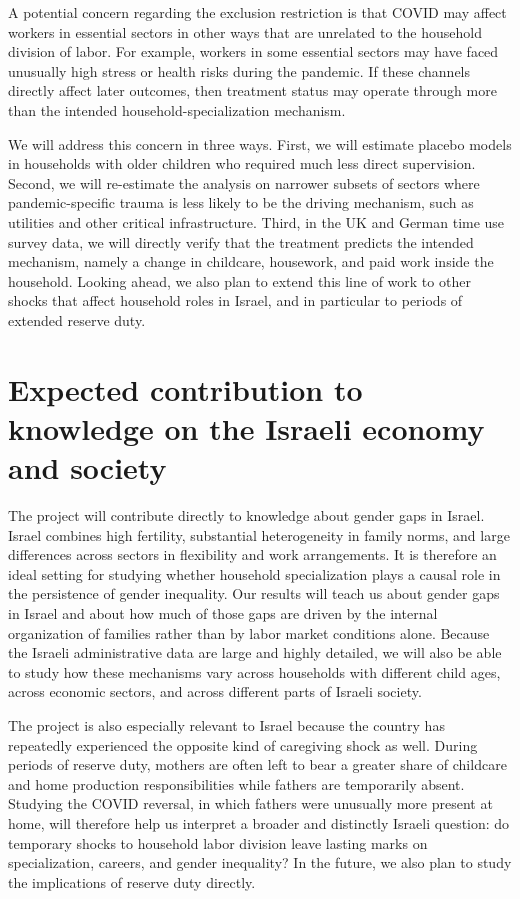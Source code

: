 \documentclass[12pt]{article}
\begin{document}
A potential concern regarding the exclusion restriction is that COVID may affect workers in essential sectors in other ways that are unrelated to the household division of labor. For example, workers in some essential sectors may have faced unusually high stress or health risks during the pandemic. If these channels directly affect later outcomes, then treatment status may operate through more than the intended household-specialization mechanism.

We will address this concern in three ways. First, we will estimate placebo models in households with older children who required much less direct supervision. Second, we will re-estimate the analysis on narrower subsets of sectors where pandemic-specific trauma is less likely to be the driving mechanism, such as utilities and other critical infrastructure. Third, in the UK and German time use survey data, we will directly verify that the treatment predicts the intended mechanism, namely a change in childcare, housework, and paid work inside the household. Looking ahead, we also plan to extend this line of work to other shocks that affect household roles in Israel, and in particular to periods of extended reserve duty.

\section{Expected contribution to knowledge on the Israeli economy and society}

The project will contribute directly to knowledge about gender gaps in Israel. Israel combines high fertility, substantial heterogeneity in family norms, and large differences across sectors in flexibility and work arrangements. It is therefore an ideal setting for studying whether household specialization plays a causal role in the persistence of gender inequality. Our results will teach us about gender gaps in Israel and about how much of those gaps are driven by the internal organization of families rather than by labor market conditions alone. Because the Israeli administrative data are large and highly detailed, we will also be able to study how these mechanisms vary across households with different child ages, across economic sectors, and across different parts of Israeli society.

The project is also especially relevant to Israel because the country has repeatedly experienced the opposite kind of caregiving shock as well. During periods of reserve duty, mothers are often left to bear a greater share of childcare and home production responsibilities while fathers are temporarily absent. Studying the COVID reversal, in which fathers were unusually more present at home, will therefore help us interpret a broader and distinctly Israeli question: do temporary shocks to household labor division leave lasting marks on specialization, careers, and gender inequality? In the future, we also plan to study the implications of reserve duty directly.
\end{document}
